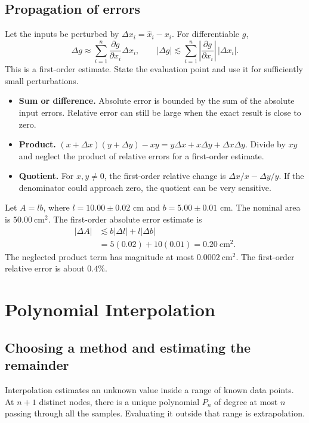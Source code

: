 \documentclass[12pt,a4paper]{article}
\begin{document}
\subsection{Propagation of errors}
\begin{tcolorbox}[formulabox, title={First-order propagation}]
Let the inputs be perturbed by $\Delta x_i=\hat x_i-x_i$. For differentiable $g$,
\[
\Delta g \approx \sum_{i=1}^n
  \frac{\partial g}{\partial x_i}\Delta x_i,\qquad
|\Delta g|\lesssim\sum_{i=1}^n
  \left|\frac{\partial g}{\partial x_i}\right|\,|\Delta x_i|.
\]
This is a first-order estimate. State the evaluation point and use it for sufficiently small perturbations.
\end{tcolorbox}

\begin{itemize}[leftmargin=*, itemsep=3pt, topsep=4pt]
  \item \textbf{Sum or difference.} Absolute error is bounded by the sum of the absolute input errors. Relative error can still be large when the exact result is close to zero.
  \item \textbf{Product.} $(x+\Delta x)(y+\Delta y)-xy=y\Delta x+x\Delta y+\Delta x\Delta y$. Divide by $xy$ and neglect the product of relative errors for a first-order estimate.
  \item \textbf{Quotient.} For $x,y\ne0$, the first-order relative change is $\Delta x/x-\Delta y/y$. If the denominator could approach zero, the quotient can be very sensitive.
\end{itemize}
\begin{tcolorbox}[examplebox, title={Propagate measurement errors in an area}]
Let $A=lb$, where $l=10.00\pm0.02$ cm and $b=5.00\pm0.01$ cm. The nominal area is $50.00\ \mathrm{cm}^2$. The first-order absolute error estimate is
\[
\begin{aligned}
|\Delta A|&\lesssim b|\Delta l|+l|\Delta b|\\
           &=5(0.02)+10(0.01)
            =0.20\ \mathrm{cm}^2.
\end{aligned}
\]
The neglected product term has magnitude at most $0.0002\ \mathrm{cm}^2$. The first-order relative error is about $0.4\%$.
\end{tcolorbox}

\section{Polynomial Interpolation}
\subsection{Choosing a method and estimating the remainder}
\begin{tcolorbox}[defbox, title={Interpolation}]
Interpolation estimates an unknown value inside a range of known data points. At $n+1$ distinct nodes, there is a unique polynomial $P_n$ of degree at most $n$ passing through all the samples. Evaluating it outside that range is extrapolation.
\end{tcolorbox}
\end{document}
